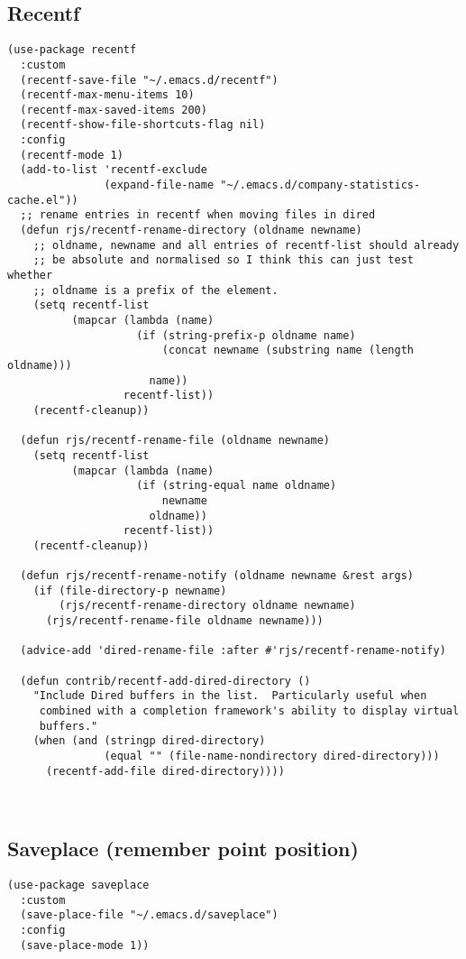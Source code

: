 \documentclass[12pt]{article}
\begin{document}
\subsection{Recentf}
\label{sec:orgdf7f838}
\begin{verbatim}
(use-package recentf
  :custom
  (recentf-save-file "~/.emacs.d/recentf")
  (recentf-max-menu-items 10)
  (recentf-max-saved-items 200)
  (recentf-show-file-shortcuts-flag nil)
  :config
  (recentf-mode 1)
  (add-to-list 'recentf-exclude
               (expand-file-name "~/.emacs.d/company-statistics-cache.el"))
  ;; rename entries in recentf when moving files in dired
  (defun rjs/recentf-rename-directory (oldname newname)
    ;; oldname, newname and all entries of recentf-list should already
    ;; be absolute and normalised so I think this can just test whether
    ;; oldname is a prefix of the element.
    (setq recentf-list
          (mapcar (lambda (name)
                    (if (string-prefix-p oldname name)
                        (concat newname (substring name (length oldname)))
                      name))
                  recentf-list))
    (recentf-cleanup))

  (defun rjs/recentf-rename-file (oldname newname)
    (setq recentf-list
          (mapcar (lambda (name)
                    (if (string-equal name oldname)
                        newname
                      oldname))
                  recentf-list))
    (recentf-cleanup))

  (defun rjs/recentf-rename-notify (oldname newname &rest args)
    (if (file-directory-p newname)
        (rjs/recentf-rename-directory oldname newname)
      (rjs/recentf-rename-file oldname newname)))

  (advice-add 'dired-rename-file :after #'rjs/recentf-rename-notify)

  (defun contrib/recentf-add-dired-directory ()
    "Include Dired buffers in the list.  Particularly useful when
     combined with a completion framework's ability to display virtual
     buffers."
    (when (and (stringp dired-directory)
               (equal "" (file-name-nondirectory dired-directory)))
      (recentf-add-file dired-directory))))



\end{verbatim}

\subsection{Saveplace (remember point position)}
\label{sec:org2890388}
\begin{verbatim}
(use-package saveplace
  :custom
  (save-place-file "~/.emacs.d/saveplace")
  :config
  (save-place-mode 1))
\end{verbatim}
\end{document}
